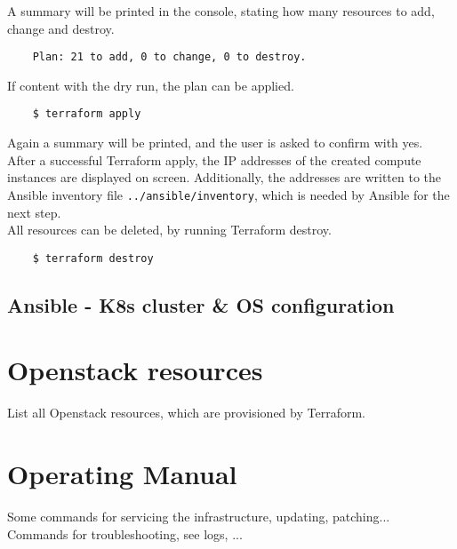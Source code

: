 \noindent
A summary will be printed in the console, stating 
how many resources to add, change and destroy. \\

\begin{verbatim}
	Plan: 21 to add, 0 to change, 0 to destroy.
\end{verbatim}

\noindent
If content with the dry run, the plan can be applied.

\begin{verbatim}
	$ terraform apply
\end{verbatim}

\noindent
Again a summary will be printed, and the user is asked to confirm with yes. \\

\noindent
After a successful Terraform apply, the IP addresses of the created compute 
instances are displayed on screen. Additionally, the addresses are written
to the Ansible inventory file \verb|../ansible/inventory|,
which is needed by Ansible for the next step. \\

\noindent
All resources can be deleted, by running Terraform destroy.

\begin{verbatim}
	$ terraform destroy
\end{verbatim}

\subsection{Ansible - K8s cluster \& OS configuration}

\section{Openstack resources}
List all Openstack resources, which are provisioned by Terraform.

\section{Operating Manual}
Some commands for servicing the infrastructure, updating, patching... \\

\noindent Commands for troubleshooting, see logs, ...
